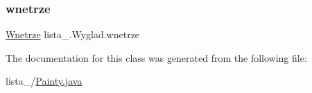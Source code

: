 \mbox{\label{classlista__5_1_1_wyglad_a76f7663502062e7784d87c1cc855721b}} 
\subsubsection{\texorpdfstring{wnetrze}{wnetrze}}
{\footnotesize\ttfamily \mbox{\hyperlink{classlista__5_1_1_wnetrze}{Wnetrze}} lista\+\_.\+Wyglad.\+wnetrze\hspace{0.3cm}{\ttfamily [package]}}



The documentation for this class was generated from the following file\+:\begin{DoxyCompactItemize}
\item 
lista\+\_/\mbox{\hyperlink{_painty_8java}{Painty.\+java}}\end{DoxyCompactItemize}
